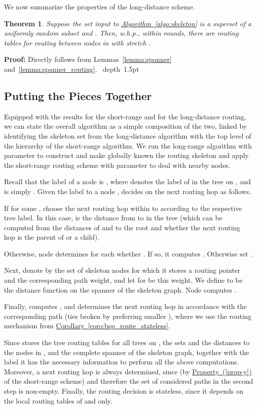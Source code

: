 \documentclass[letterpaper,11pt]{article}
\newcommand{\namedref}[2]{\hyperref[#2]{#1~\ref*{#2}}}
\newcommand{\corollaryref}[1]{\namedref{Corollary}{#1}}
\newcommand{\algref}[1]{\namedref{Algorithm}{#1}}
\newcommand{\pprtyref}[1]{\hyperref[#1]{Property~(\ref*{#1})}}
\newtheorem{theorem}{Theorem}[section]
\newcommand{\blackslug}{\hbox{\hskip 1pt \vrule width 4pt height 8pt
depth 1.5pt \hskip 1pt}}
\newcommand{\QED}{\quad\blackslug\lower 8.5pt\null\par}
\newenvironment{proof}[1][Proof:]{\noindent \textbf{#1}\xspace}{\QED}
\begin{document}
We now summarize the properties of the long-distance scheme. 
\begin{theorem}\label{theorem:spanner}
Suppose the set  input to \algref{algo:skeleton} is a superset of a
uniformly random subset  and . Then, w.h.p., 
within  rounds, there are
routing tables for routing between nodes in  with stretch .
\end{theorem}
\begin{proof}
Directly follows from Lemmas~\ref{lemma:spanner}
and~\ref{lemma:spanner_routing}.
\end{proof}


\subsection{Putting the Pieces Together}
\label{sec-tog}
Equipped with the results for the short-range and for the
long-distance routing, we can state the overall algorithm as a simple
composition of the two, linked by identifying the skeleton set from
the long-distance algorithm with the top level of the hierarchy 
of the short-range algorithm.  We run the long-range algorithm with
parameter  to construct and make globally known the routing
skeleton and apply the short-range routing scheme with parameter 
to deal with nearby nodes.

Recall that the label of a node  is
,
where  denotes the label of  in the tree on
, and  is simply . Given the label 
to a node ,  decides on the next routing hop as follows.
\begin{compactitem}
  \item If  for some , choose the next routing hop
  within  to  according to the respective tree label. In this
  case,  is the distance from  to  in the tree (which can be computed
  from the distances of  and  to the root  and whether the
  next routing hop is the parent of  or a child).  
  \item Otherwise, node  determines for each  whether . If so, it computes . Otherwise set .
  \item Next, denote by  the set of skeleton nodes  for
  which it stores a routing pointer and the corresponding path weight, and let
  for   be this weight. We define  to be the distance
  function on the spanner of the skeleton graph. Node  computes
  .
  \item Finally,  computes , and
  determines the next routing hop in accordance with the corresponding path (ties
  broken by preferring smaller ), where we use the
  routing mechanism from \corollaryref{coro:bsp_route_stateless}.
\end{compactitem}
Since  stores the tree routing tables for all trees on ,
the sets  and the distances to the nodes in , and
the complete spanner of the skeleton graph, together with the label 
it has the necessary information to perform all the above computations. Moreover, a next
routing hop is always determined, since  (by
\pprtyref{prop-y} of the short-range scheme) and therefore the set of
considered paths in the second step is non-empty. Finally, the routing decision
is stateless, since it depends on the local routing tables of  and
 only.
\end{document}
